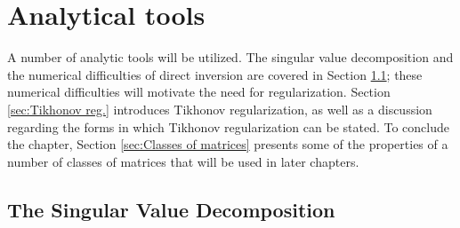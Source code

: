 \chapter{Analytical tools} \label{ch:Analytical tools}

A number of analytic tools will be utilized. The singular value decomposition and the numerical difficulties of direct inversion are covered in Section \ref{sec:SVD}; these numerical difficulties will motivate the need for regularization. Section \ref{sec:Tikhonov reg.} introduces Tikhonov regularization, as well as a discussion regarding the forms in which Tikhonov regularization can be stated.  To conclude the chapter, Section \ref{sec:Classes of matrices} presents some of the properties of a number of classes of matrices that will be used in later chapters.

\section{The Singular Value Decomposition} \label{sec:SVD}

